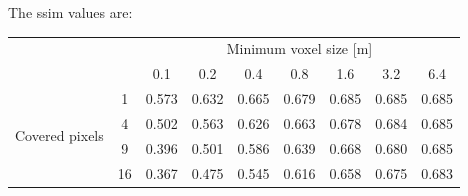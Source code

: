 The \ac{ssim} values are:
\begin{center}
    \begin{tabular}{| c | c | c | c | c | c | c | c | c |}
        \cline{3-9}
        \multicolumn{2}{c|}{} & \multicolumn{7}{c|}{Minimum voxel size [m]} \\
        \cline{3-9}
        \multicolumn{2}{c|}{} & 0.1 & 0.2 & 0.4 & 0.8 & 1.6 & 3.2 & 6.4 \\
        \hline
        \multirow{4}{*}{Covered pixels}& 1 & 0.573 & 0.632 & 0.665 & 0.679 & 0.685 & 0.685 & 0.685 \\
        \cline{2-9}
        & 4 & 0.502 & 0.563 & 0.626 & 0.663 & 0.678 & 0.684 & 0.685 \\
        \cline{2-9}
        & 9 & 0.396 & 0.501 & 0.586 & 0.639 & 0.668 & 0.680 & 0.685 \\
        \cline{2-9}
        & 16 & 0.367 & 0.475 & 0.545 & 0.616 & 0.658 & 0.675 & 0.683 \\
        \hline
    \end{tabular}
\end{center}